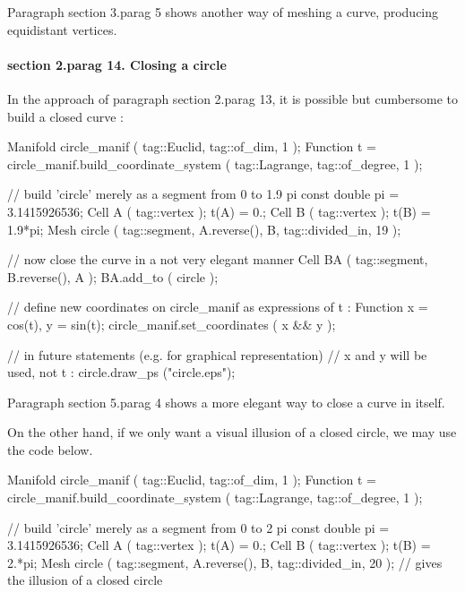 Paragraph \numb section 3.\numb parag 5 shows another way of meshing a curve,
producing equidistant vertices.


\paragraph{\numb section 2.\numb parag 14. Closing a circle}

In the approach of paragraph \numb section 2.\numb parag 13, it is possible but cumbersome to
build a closed curve :

\verbatim
   Manifold circle_manif ( tag::Euclid, tag::of_dim, 1 );
   Function t = circle_manif.build_coordinate_system
      ( tag::Lagrange, tag::of_degree, 1 );

   // build 'circle' merely as a segment from 0 to 1.9 pi
   const double pi = 3.1415926536;
   Cell A ( tag::vertex );  t(A) =  0.;
   Cell B ( tag::vertex );  t(B) =  1.9*pi;
   Mesh circle ( tag::segment, A.reverse(), B, tag::divided_in, 19 );

   // now close the curve in a not very elegant manner
   Cell BA ( tag::segment, B.reverse(), A );
   BA.add_to ( circle );

   // define new coordinates on circle_manif as expressions of t :
   Function x = cos(t), y = sin(t);
   circle_manif.set_coordinates ( x && y );

   // in future statements (e.g. for graphical representation)
   // x and y will be used, not t :
   circle.draw_ps ("circle.eps");
\endverbatim


Paragraph \numb section 5.\numb parag 4 shows a more elegant way to close a curve in itself.

On the other hand, if we only want a visual illusion of a closed circle, we may use the code below.

\verbatim
   Manifold circle_manif ( tag::Euclid, tag::of_dim, 1 );
   Function t = circle_manif.build_coordinate_system
      ( tag::Lagrange, tag::of_degree, 1 );

   // build 'circle' merely as a segment from 0 to 2 pi
   const double pi = 3.1415926536;
   Cell A ( tag::vertex );  t(A) =  0.;
   Cell B ( tag::vertex );  t(B) =  2.*pi;
   Mesh circle ( tag::segment, A.reverse(), B, tag::divided_in, 20 );
   // gives the illusion of a closed circle

